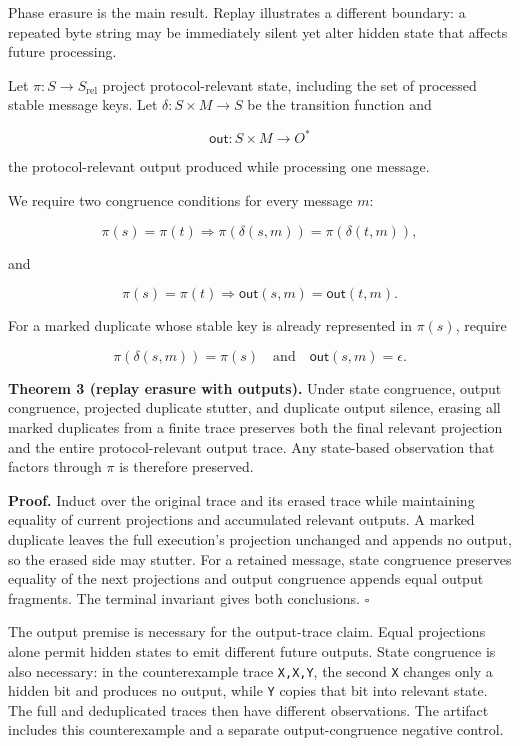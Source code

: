 Phase erasure is the main result. Replay illustrates a different
boundary: a repeated byte string may be immediately silent yet alter
hidden state that affects future processing.

Let \(\pi:S\to S_{\mathrm{rel}}\) project protocol-relevant state,
including the set of processed stable message keys. Let
\(\delta:S\times M\to S\) be the transition function and

\[
\mathsf{out}:S\times M\to O^*
\]

the protocol-relevant output produced while processing one message.

We require two congruence conditions for every message \(m\):

\[
\pi(s)=\pi(t)
\Rightarrow
\pi(\delta(s,m))=\pi(\delta(t,m)),
\tag{state congruence}
\]

and

\[
\pi(s)=\pi(t)
\Rightarrow
\mathsf{out}(s,m)=\mathsf{out}(t,m).
\tag{output congruence}
\]

For a marked duplicate whose stable key is already represented in
\(\pi(s)\), require

\[
\pi(\delta(s,m))=\pi(s)
\quad\text{and}\quad
\mathsf{out}(s,m)=\epsilon.
\]

\textbf{Theorem 3 (replay erasure with outputs).} Under state
congruence, output congruence, projected duplicate stutter, and
duplicate output silence, erasing all marked duplicates from a finite
trace preserves both the final relevant projection and the entire
protocol-relevant output trace. Any state-based observation that factors
through \(\pi\) is therefore preserved.

\textbf{Proof.} Induct over the original trace and its erased trace
while maintaining equality of current projections and accumulated
relevant outputs. A marked duplicate leaves the full execution's
projection unchanged and appends no output, so the erased side may
stutter. For a retained message, state congruence preserves equality of
the next projections and output congruence appends equal output
fragments. The terminal invariant gives both conclusions. \(\square\)

The output premise is necessary for the output-trace claim. Equal
projections alone permit hidden states to emit different future outputs.
State congruence is also necessary: in the counterexample trace
\texttt{X,X,Y}, the second \texttt{X} changes only a hidden bit and
produces no output, while \texttt{Y} copies that bit into relevant
state. The full and deduplicated traces then have different
observations. The artifact includes this counterexample and a separate
output-congruence negative control.

